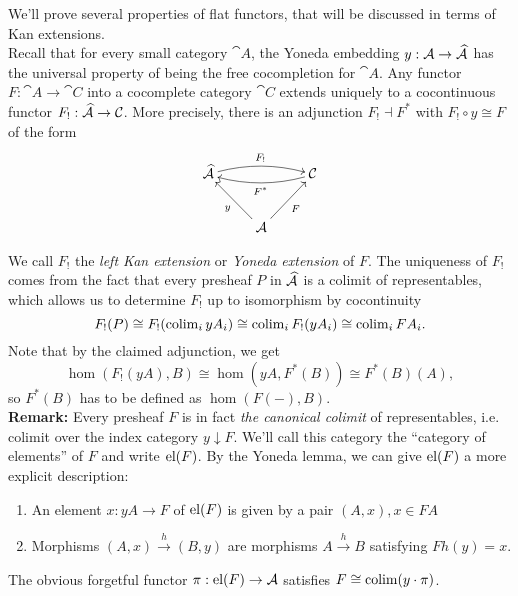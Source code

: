 We'll prove several properties of flat functors, that will be discussed in terms of Kan extensions. \\

Recall that for every small category $\cat A$, the Yoneda embedding $y : \mathcal{A} \to \widehat{\mathcal{A}}$ has the universal property of being the free cocompletion for $\cat A$. Any functor $F : \cat A \to \cat C$ into a cocomplete category $\cat C$ extends uniquely to a cocontinuous functor $F_!: \widehat{\mathcal{A}} \to \mathcal{C}$. More precisely, there is an adjunction $F_! \dashv F^*$ with $F_! \circ y \cong F$ of the form
\[
\xymatrix{
\pre{\cat A} \ar@/^/[rr]^{F_!} & & \cat C \ar@/^/[ll]^{F^*} \\
& \cat A \ar[lu]^{y} \ar[ru]_{F}
}\]

We call $F_!$ the \emph{left Kan extension} or \emph{Yoneda extension} of $F$. The uniqueness of $F_!$ comes from the fact that every presheaf $P$ in $\widehat{\mathcal{A}}$ is a colimit of representables, which allows us to determine $F_!$ up to isomorphism by cocontinuity
\[ F_!(P) \cong F_!(\operatorname{colim}_i yA_i) \cong \operatorname{colim}_i F_!(yA_i) \cong \operatorname{colim}_i FA_i. \]
Note that by the claimed adjunction, we get
\[ \hom(F_!(yA),B) \cong \hom(yA,F^*(B)) \cong F^*(B)(A), \]
so $F^*(B)$ has to be defined as $\hom(F(-),B)$. \\ 


\textbf{Remark: } Every presheaf $F$ is in fact \emph{the canonical colimit} of representables, i.e. colimit over the index category $y \downarrow F$. We'll call this category the ``category of elements'' of $F$ and write $\textrm{el}(F)$. By the Yoneda lemma, we can give $\textrm{el}(F)$ a more explicit description:
\begin{enumerate}
\item An element $x : yA \to F$ of $\textrm{el}(F)$ is given by a pair $(A,x), x \in FA$
\item Morphisms $(A,x) \xrightarrow{h} (B,y)$ are morphisms $A \xrightarrow{h} B$ satisfying $Fh(y) = x$.
\end{enumerate}
The obvious forgetful functor $\pi : \textrm{el}(F) \to \mathcal{A}$ satisfies $F \cong \operatorname{colim} (y\cdot \pi)$. \\

